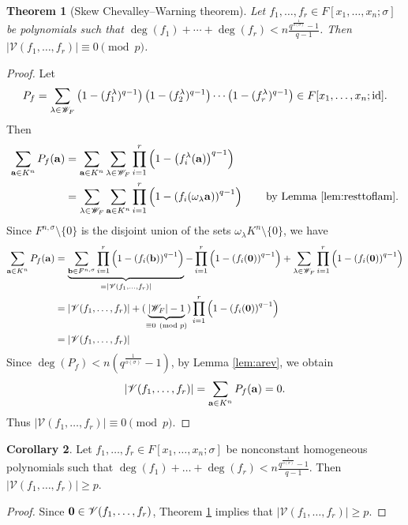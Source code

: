 \documentclass[11pt,reqno]{amsart}
\newtheorem{thm}{Theorem}[section]
\theoremstyle{definition}
\newtheorem{cor}[thm]{Corollary}
\begin{document}
\begin{thm}[Skew Chevalley--Warning theorem]\label{thm:skewchevwar}
Let $f_1,\dots,f_r \in F[x_1,\dots,x_n;\sigma]$ be polynomials such that $\deg(f_1)+\cdots+\deg(f_r)<n \frac{q^{\frac{1}{o(\sigma)}}-1}{q-1}$. Then $|\mathscr{V}(f_1,\dots,f_r)|\equiv 0 \pmod{p}$. 
\end{thm}
\begin{proof}
Let $$P_f=\sum_{\lambda \in \mathscr{W}_F}\left(1- (f^\lambda_1)^{q-1} \right) \left(1- (f^\lambda_2)^{q-1} \right) \cdots \left(1- (f^\lambda_r)^{q-1} \right) \in F[x_1,\dots,x_n;{\rm id}].$$
Then
\begin{align*}
\sum_{{\bf a} \in K^n} P_f({\bf a})&=\sum_{{\bf a} \in K^n}\sum_{\lambda \in \mathscr{W}_F}\prod_{i=1}^r\left(1-\left(f^\lambda_i({\bf a})\right)^{q-1}\right)\\
&=\sum_{\lambda \in \mathscr{W}_F}\sum_{{\bf a}\in K^n}\prod_{i=1}^r\left(1-\left(f_i(\omega_\lambda {\bf a})\right)^{q-1}\right)\quad\quad\textrm{by Lemma \ref{lem:resttoflam}}.
\end{align*}
Since $F^{n,\sigma}\setminus\{0\}$ is the disjoint union of the sets $\omega_\lambda K^n\setminus\{0\}$, we have
\begin{align*}
\sum_{{\bf a} \in K^n} P_f({\bf a})&=\underbrace{\sum_{{\bf b} \in F^{n,\sigma}}\prod_{i=1}^r\left(1-\left(f_i({\bf b})\right)^{q-1}\right)}_{=|\mathscr{V}(f_1,\dots,f_r)|}-\prod_{i=1}^r\left(1-\left(f_i({\bf 0})\right)^{q-1}\right)+
\sum_{\lambda \in \mathscr{W}_F}\prod_{i=1}^r\left(1-\left(f_i({\bf 0})\right)^{q-1}\right)\\
&=|\mathscr{V}(f_1,\dots,f_r)|+(\underbrace{|\mathscr{W}_F|-1}_{\equiv 0 \pmod{p}})\prod_{i=1}^r\left(1-\left(f_i({\bf 0})\right)^{q-1}\right)\\
&=|\mathscr{V}(f_1,\dots,f_r)|
\end{align*}
Since $\deg(P_f)<n\left(q^{\frac{1}{o(\sigma)}}-1\right)$, by Lemma \ref{lem:arev}, we obtain
$$
|\mathscr{V}(f_1,\dots,f_r)|= \sum_{{\bf a} \in K^n}P_f({\bf a}) = 0.
$$
Thus $|\mathscr{V}(f_1,\dots,f_r)|\equiv 0 \pmod{p}$.
\end{proof}
\begin{cor}\label{cor:effnull}
Let $f_1,\dots,f_r \in F[x_1,\dots,x_n;\sigma]$ be nonconstant homogeneous polynomials such that $\deg(f_1)+\dots+\deg(f_r)<n \frac{q^{\frac{1}{o(\sigma)}}-1}{q-1}$. Then $|\mathscr{V}(f_1,\dots,f_r)|\geq p$. 
\end{cor}
\begin{proof}
Since ${\bf 0} \in \mathscr{V}(f_1,\dots,f_r)$, Theorem \ref{thm:skewchevwar} implies that $|\mathscr{V}(f_1,\dots,f_r)|\geq p$. 
\end{proof}
\end{document}
